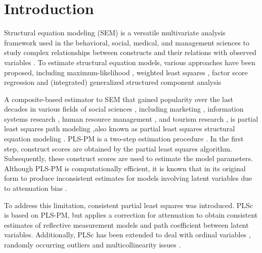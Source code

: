 \documentclass[12pt,a4paper]{article}\usepackage[]{graphicx}\usepackage[]{xcolor}
\begin{document}
\newpage


\section*{Introduction}

Structural equation modeling (SEM) is a versatile multivariate analysis framework used in the behavioral, social, medical, and management sciences to study complex relationships between constructs and their relations with observed variables \citep[e.g.,][]{Marcoulides1996,Kline2023}.
To estimate structural equation models, various approaches have been proposed, including maximum-likelihood \citep{Joereskog1970}, weighted least squares \citep{Browne1974}, factor score regression \citep{Skrondal2001,Devlieger2017} and (integrated) generalized structured component analysis \citep{Hwang2004,Hwang2021a}

A composite-based estimator to SEM that gained popularity over the last decades in various fields of social sciences \citep{Cook2023}, including marketing \citep{Sarstedt2022a}, information systems research \citep{Benitez2020,Evermann2021}, human resource management \citep{Ringle2020}, and tourism research \citep{Mueller2018}, is partial least squares path modeling \citep[PLS-PM,][]{Wold1982c},also known as partial least squares structural equation modeling \citep[PLS-SEM,][]{Hair2011}.
PLS-PM is a two-step estimation procedure \citep{Schuberth2023d}.
In the first step, construct scores are obtained by the partial least squares algorithm.
Subsequently, these construct scores are used to estimate the model parameters.
Although PLS-PM is computationally efficient, it is known that in its original form to produce inconsistent estimates for models involving latent variables due to attenuation bias \citep[e.g.,][]{Hui1982,Dijkstra1985,Roenkkoe2013,Schuberth2023}.

To address this limitation, consistent partial least squares \citep[PLSc,][]{Dijkstra2013,Dijkstra2014a,Dijkstra2015,Dijkstra2015a} was introduced.
PLSc is based on PLS-PM, but applies a correction for attenuation to obtain consistent estimates of reflective measurement models and path coefficient between latent variables.
Additionally, PLSc has been extended to deal with ordinal variables \citep{Schuberth2018a}, randomly occurring outliers \citep{Schamberger2020} and multicollinearity issues \citep{Jung2018}.
\end{document}

